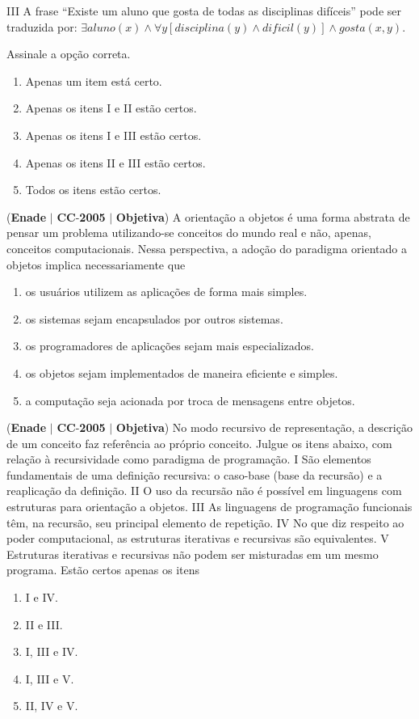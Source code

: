 \documentclass{exam}
\begin{document}
\begin{questions}
III A frase “Existe um aluno que gosta de todas as disciplinas
difíceis” pode ser traduzida por: $\exists aluno(x) \wedge \forall y [disciplina(y) \wedge dificil(y)] \wedge gosta(x, y).$

Assinale a opção correta.
	\begin{enumerate}[label=\alph*)]
		\item  Apenas um item está certo.
		\item  Apenas os itens I e II estão certos.
		\item  Apenas os itens I e III estão certos.
		\item  Apenas os itens II e III estão certos.
		\item  Todos os itens estão certos.
	\end{enumerate}

\question (\textbf{Enade} $|$ \textbf{CC}-\textbf{2005} $|$ \textbf{Objetiva})
A orientação a objetos é uma forma abstrata de pensar um
problema utilizando-se conceitos do mundo real e não, apenas,
conceitos computacionais. Nessa perspectiva, a adoção do
paradigma orientado a objetos implica necessariamente que
	\begin{enumerate}[label=\alph*)]
		\item  os usuários utilizem as aplicações de forma mais simples.
		\item  os sistemas sejam encapsulados por outros sistemas.
		\item  os programadores de aplicações sejam mais especializados.
		\item  os objetos sejam implementados de maneira eficiente e
simples.
		\item  a computação seja acionada por troca de mensagens entre
objetos.
	\end{enumerate}

\question (\textbf{Enade} $|$ \textbf{CC}-\textbf{2005} $|$ \textbf{Objetiva})
No modo recursivo de representação, a descrição de um
conceito faz referência ao próprio conceito. Julgue os itens
abaixo, com relação à recursividade como paradigma de
programação.
I São elementos fundamentais de uma definição recursiva:
o caso-base (base da recursão) e a reaplicação da definição.
II O uso da recursão não é possível em linguagens com
estruturas para orientação a objetos.
III As linguagens de programação funcionais têm, na recursão,
seu principal elemento de repetição.
IV No que diz respeito ao poder computacional, as estruturas
iterativas e recursivas são equivalentes.
V Estruturas iterativas e recursivas não podem ser misturadas
em um mesmo programa.
Estão certos apenas os itens
	\begin{enumerate}[label=\alph*)]
		\item  I e IV.
		\item  II e III.
		\item  I, III e IV.
		\item  I, III e V.
		\item  II, IV e V.
	\end{enumerate}


\end{questions}
\end{document}
